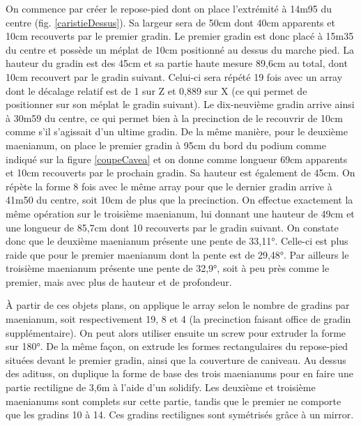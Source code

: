 On commence par créer le repose-pied dont on place l'extrémité à 14m95 du centre (fig. \ref{caristieDessus}). Sa largeur sera de 50cm dont 40cm apparents et 10cm recouverts par le premier gradin. Le premier gradin est donc placé à 15m35 du centre et possède un méplat de 10cm positionné au dessus du marche pied. La hauteur du gradin est des 45cm et sa partie haute mesure 89,6cm au total, dont 10cm recouvert par le gradin suivant. Celui-ci sera répété 19 fois avec un \gls{array} dont le décalage relatif est de 1 sur Z et 0,889 sur X (ce qui permet de positionner sur son méplat le gradin suivant). Le dix-neuvième gradin arrive ainsi à 30m59 du centre, ce qui permet bien à la \gls{precinction} de le recouvrir de 10cm comme s'il s'agissait d'un ultime gradin. De la même manière, pour le deuxième \gls{maenianum}, on place le premier gradin à 95cm du bord du \gls{podium} comme indiqué sur la figure \ref{coupeCavea} et on donne comme longueur 69cm apparents et 10cm recouverts par le prochain gradin. Sa hauteur est également de 45cm. On répète la forme 8 fois avec le même \gls{array} pour que le dernier gradin arrive à 41m50 du centre, soit 10cm de plus que la  \gls{precinction}. On effectue exactement la même opération sur le troisième \gls{maenianum}, lui donnant une hauteur de 49cm et une longueur de 85,7cm dont 10 recouverts par le gradin suivant. On constate donc que le deuxième \gls{maenianum} présente une pente de 33,11°. Celle-ci est plus raide que pour le premier \gls{maenianum} dont la pente est de 29,48°. Par ailleurs le troisième \gls{maenianum} présente une pente de 32,9°, soit à peu près comme le premier, mais avec plus de hauteur et de profondeur.

\`{A} partir de ces objets plans, on applique le \gls{array} selon le nombre de gradins par \gls{maenianum}, soit respectivement 19, 8 et 4 (la \gls{precinction} faisant office de gradin supplémentaire). On peut alors utiliser ensuite un \gls{screw} pour extruder la forme sur 180°. De la même façon, on extrude les formes rectangulaires du repose-pied situées devant le premier gradin, ainsi que la couverture de caniveau. Au dessus des \glspl{aditus}, on duplique la forme de base des trois \glspl{maenianum} pour en faire une partie rectiligne de 3,6m à l'aide d'un \gls{solidify}. Les deuxième et troisième \glspl{maenianum} sont complets sur cette partie, tandis que le premier ne comporte que les gradins 10 à 14. Ces gradins rectilignes sont symétrisés grâce à un \gls{mirror}.

